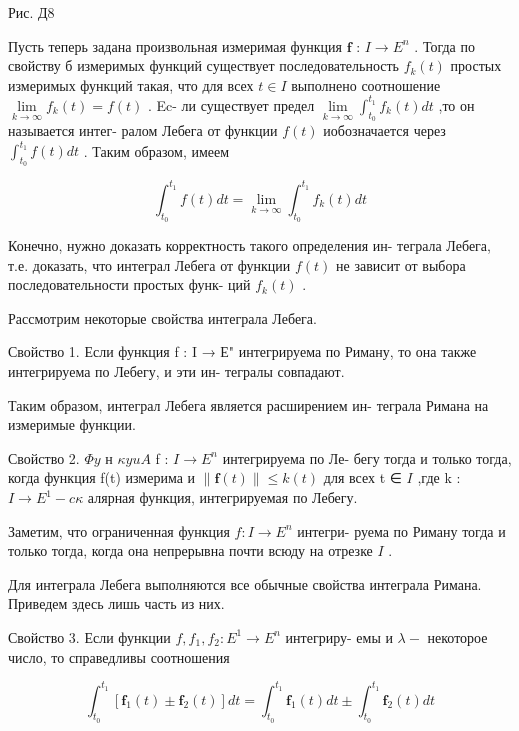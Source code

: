 \documentclass[8pt]{extarticle}
\begin{document}
Рис. Д8

\iffalse
Пусть теперь задана произвольная измеримая функция \(\mathbf{f}\) : \(I \rightarrow  {E}^{n}\) . Тогда по свойству б измеримых функций существует последовательность \({f}_{k}\left( t\right)\) простых измеримых функций такая, что для всех \(t \in  I\) выполнено соотношение \(\mathop{\lim }\limits_{{k \rightarrow  \infty }}{f}_{k}\left( t\right)  = f\left( t\right)\) . Ec- ли существует предел \(\mathop{\lim }\limits_{{k \rightarrow  \infty }}{\int }_{{t}_{0}}^{{t}_{1}}{f}_{k}\left( t\right) {dt}\) ,то он называется интег- ралом Лебега от функции \(f\left( t\right)\) иобозначается через \({\int }_{{t}_{0}}^{{t}_{1}}f\left( t\right) {dt}\) . Таким образом, имеем

\[
{\int }_{{t}_{0}}^{{t}_{1}}f\left( t\right) {dt} = \mathop{\lim }\limits_{{k \rightarrow  \infty }}{\int }_{{t}_{0}}^{{t}_{1}}{f}_{k}\left( t\right) {dt}
\]

Конечно, нужно доказать корректность такого определения ин- теграла Лебега, т.е. доказать, что интеграл Лебега от функции \(f\left( t\right)\) не зависит от выбора последовательности простых функ- ций \({f}_{k}\left( t\right)\) .

Рассмотрим некоторые свойства интеграла Лебега.

Свойство 1. Если функция f : I → Е" интегрируема по Риману, то она также интегрируема по Лебегу, и эти ин- тегралы совпадают.

Таким образом, интеграл Лебега является расширением ин- теграла Римана на измеримые функции.

Свойство 2. \({\Phi y} \text{ н } {\kappa yuA}\) f : \(I \rightarrow  {E}^{n}\) интегрируема по Ле- бегу тогда и только тогда, когда функция f(t) измерима и \(\parallel \mathbf{f}\left( t\right) \parallel  \leq  k\left( t\right)\) для всех t ∈ \(I\) ,где k : \(I \rightarrow  {E}^{1} - {c\kappa }\) алярная функция, интегрируемая по Лебегу.

Заметим, что ограниченная функция \(f : I \rightarrow  {E}^{n}\) интегри- руема по Риману тогда и только тогда, когда она непрерывна почти всюду на отрезке \(I\) .

Для интеграла Лебега выполняются все обычные свойства интеграла Римана. Приведем здесь лишь часть из них.

Свойство 3. Если функции \(f,{f}_{1},{f}_{2} : {E}^{1} \rightarrow  {E}^{n}\) интегриру- емы и \(\lambda  -\) некоторое число, то справедливы соотношения

\[
{\int }_{{t}_{0}}^{{t}_{1}}\left\lbrack  {{\mathbf{f}}_{1}\left( t\right)  \pm  {\mathbf{f}}_{2}\left( t\right) }\right\rbrack  {dt} = {\int }_{{t}_{0}}^{{t}_{1}}{\mathbf{f}}_{1}\left( t\right) {dt} \pm  {\int }_{{t}_{0}}^{{t}_{1}}{\mathbf{f}}_{2}\left( t\right) {dt}
\]
\end{document}
